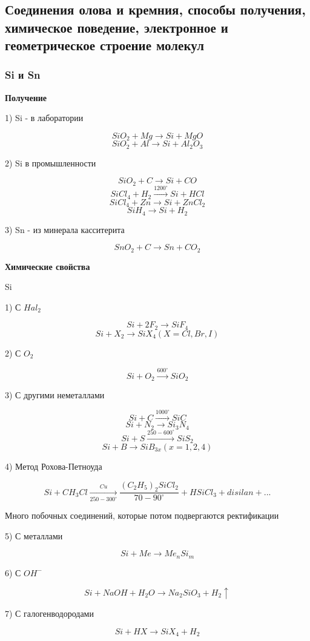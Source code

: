 \documentclass[14pt,a4paper]{scrartcl}
\begin{document}
\subsection{Соединения олова и кремния, способы получения, химическое поведение, электронное и геометрическое строение молекул}

\subsubsection{Si и Sn}

\textbf{Получение}

1) Si - в лаборатории

$$SiO_2 + Mg \rightarrow Si + MgO$$
$$SiO_2 + Al \rightarrow Si + Al_2O_3$$

2) Si в промышленности

$$SiO_2 + C \rightarrow Si +  CO$$
$$SiCl_4 + H_2 \xrightarrow{1200^{\circ}} Si + HCl$$
$$SiCl_4 + Zn \rightarrow Si + ZnCl_2$$
$$SiH_4 \rightarrow Si + H_2$$

3) Sn - из минерала касситерита

$$SnO_2 + C \rightarrow Sn + CO_2$$

\textbf{Химические свойства}

Si

1) С $Hal_2$

$$Si + 2F_2 \rightarrow SiF_4$$
$$Si + X_2 \rightarrow SiX_4 (X = Cl, Br, I)$$

2) С $O_2$

$$Si + O_2 \xrightarrow{600^{\circ}} SiO_2$$

3) С другими неметаллами

$$Si + C \xrightarrow{1000^{\circ}} SiC$$
$$Si + N_2 \rightarrow Si_3N_4$$
$$Si + S \xrightarrow{250-600^{\circ}} SiS_2$$
$$Si + B \rightarrow SiB_{3x} (x = 1,2,4)$$

4) Метод Рохова-Петноуда

$$Si + CH_3Cl \xrightarrow[250-300^{\circ}]{Cu} \frac{(C_2H_5)_2SiCl_2}{70-90^{\circ}} + HSiCl_3 + disilan + ...$$

Много побочных соединений, которые потом подвергаются ректификации

5) С металлами

$$Si + Me \rightarrow Me_nSi_m$$

6) С $OH^-$

$$Si + NaOH + H_2O \rightarrow Na_2SiO_3 + H_2 \uparrow$$

7) С галогенводородами

$$Si + HX \rightarrow SiX_4 + H_2$$
\end{document}
